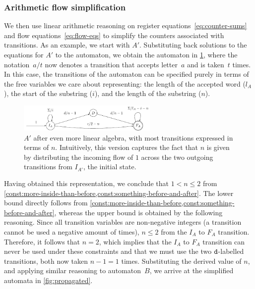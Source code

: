 \subsubsection{Arithmetic flow simplification}\label{sec:intuition:algebra}

We then use linear arithmetic reasoning on register
equations~\eqref{eq:counter-sums} and flow
equations~\eqref{eq:flow-eqs} to simplify the counters associated
with transitions.
As an example, we start with $A'$. Substituting back
solutions to the equations for $A'$ to the automaton, we obtain the
automaton in \cref{fig:a_2}, where the notation~$a / t$ now denotes
a transition that accepts letter~$a$ and is taken~$t$ times.
In this case, the transitions of the automaton
can be specified purely in terms of the free
variables we care about representing:  the length of the accepted word ($l_A$), the
start of the substring ($i$), and the length of the substring ($n$).

\begin{figure}[tb]
  \centering 
  \includegraphics[width=0.6\textwidth]{a_2}
  \caption{ $A'$ after even more linear algebra, with most transitions expressed
  in terms of $n$. Intuitively, this version captures the fact that $n$ is given
  by distributing the incoming flow of $1$ across the two outgoing transitions
  from $I_{A'}$, the initial state.}
  \label{fig:a_2}
\end{figure}

Having obtained this representation, we conclude that $1 < n \leq 2$
from
\cref{const:more-inside-than-before,const:something-before-and-after}. The
lower bound directly follows from
\cref{const:more-inside-than-before,const:something-before-and-after},
whereas the upper bound is obtained by the following reasoning. Since all
transition variables are non-negative integers (a transition cannot be
used a negative amount of times), $n \leq 2$ from the $I_A$ to $F_A$
transition. Therefore, it follows that $n=2$, which implies that the
$I_A$ to $F_A$ transition can never be used under these constraints
and that we must use the two $\texttt{d}$-labelled transitions, both now
taken $n-1 =1$ times.
%
Substituting the derived value of $n$, and applying similar
reasoning to automaton~$B$, we arrive at the simplified
automata in \cref{fig:propagated}.

